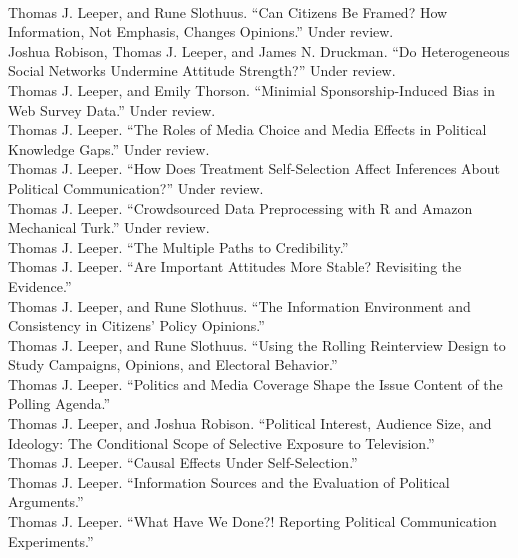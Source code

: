 \documentclass[12pt]{article}
\newcommand{\topic}[1]{\pagebreak[3]\indent {\color{lg}{\footnotesize #1 }}\\}
\newcommand{\entry}[1]{\indent {\color{lg}\guillemotright}\hspace{2pt}#1\vspace{.25em}\\}
\begin{document}
\topic{Working Papers and Papers Under Review}
\entry{Thomas J. Leeper, and Rune Slothuus. ``Can Citizens Be Framed? How Information, Not Emphasis, Changes Opinions.'' Under review.}
\entry{Joshua Robison, Thomas J. Leeper, and James N. Druckman. ``Do Heterogeneous Social Networks Undermine Attitude Strength?'' Under review.}
\entry{Thomas J. Leeper, and Emily Thorson. ``Minimial Sponsorship-Induced Bias in Web Survey Data.'' Under review.}
\entry{Thomas J. Leeper. ``The Roles of Media Choice and Media Effects in Political Knowledge Gaps.'' Under review.}
\entry{Thomas J. Leeper. ``How Does Treatment Self-Selection Affect Inferences About Political Communication?'' Under review.}
\entry{Thomas J. Leeper. ``Crowdsourced Data Preprocessing with R and Amazon Mechanical Turk.'' Under review.}
\entry{Thomas J. Leeper. ``The Multiple Paths to Credibility.''}
\entry{Thomas J. Leeper. ``Are Important Attitudes More Stable? Revisiting the Evidence.''}
\entry{Thomas J. Leeper, and Rune Slothuus. ``The Information Environment and Consistency in Citizens' Policy Opinions.''}
\entry{Thomas J. Leeper, and Rune Slothuus. ``Using the Rolling Reinterview Design to Study Campaigns, Opinions, and Electoral Behavior.''}
\entry{Thomas J. Leeper. ``Politics and Media Coverage Shape the Issue Content of the Polling Agenda.''}
\entry{Thomas J. Leeper, and Joshua Robison. ``Political Interest, Audience Size, and Ideology: The Conditional Scope of Selective Exposure to Television.''}
\entry{Thomas J. Leeper. ``Causal Effects Under Self-Selection.''}
\entry{Thomas J. Leeper. ``Information Sources and the Evaluation of Political Arguments.''}
\entry{Thomas J. Leeper. ``What Have We Done?! Reporting Political Communication Experiments.''}
\end{document}
